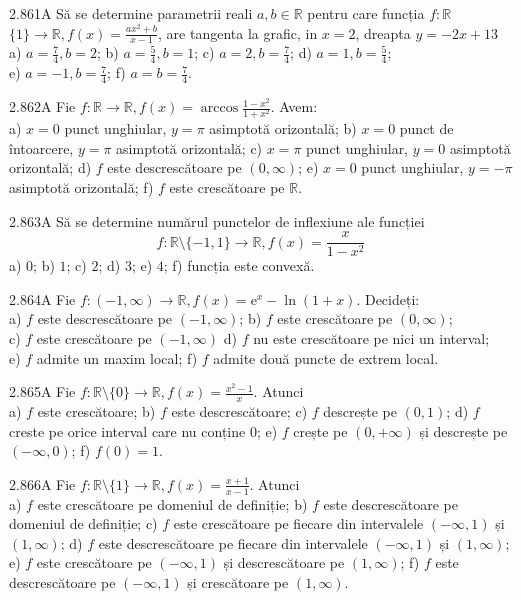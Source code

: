 \documentclass[11pt]{article}
\begin{document}
2.861A Să se determine parametrii reali $a, b \in \mathbb{R}$ pentru care funcția $f: \mathbb{R}$ $\{1\} \rightarrow \mathbb{R}, f(x)=\frac{a x^{2}+b}{x-1}$, are tangenta la grafic, in $x=2$, dreapta $y=-2 x+13$\\ a) $a=\frac{7}{4}, b=2$; b) $a=\frac{5}{4}, b=1$; c) $a=2, b=\frac{7}{4}$; d) $a=1, b=\frac{5}{4}$;\\ e) $a=-1, b=\frac{7}{4}$; f) $a=b=\frac{7}{4}$.

2.862A Fie $f: \mathbb{R} \rightarrow \mathbb{R}, f(x)=\arccos \frac{1-x^{2}}{1+x^{2}}$. Avem:\\ a) $x=0$ punct unghiular, $y=\pi$ asimptotă orizontală; b) $x=0$ punct de întoarcere, $y=\pi$ asimptotă orizontală; c) $x=\pi$ punct unghiular, $y=0$ asimptotă orizontală; d) $f$ este descrescătoare pe $(0, \infty)$; e) $x=0$ punct unghiular, $y=-\pi$ asimptotă orizontală; f) $f$ este crescătoare pe $\mathbb{R}$.

2.863A Să se determine numărul punctelor de inflexiune ale funcției $$f: \mathbb{R} \setminus\{-1,1\} \rightarrow \mathbb{R}, f(x)=\frac{x}{1-x^{2}}$$ a) $0$; b) $1$; c) $2$; d) $3$; e) $4$; f) funcția este convexă.

2.864A Fie $f:(-1, \infty) \rightarrow \mathbb{R}, f(x)=\mathrm{e}^{x}-\ln (1+x)$. Decideți:\\ a) $f$ este descrescătoare pe $(-1, \infty)$; b) $f$ este crescătoare pe $(0, \infty)$;\\ c) $f$ este crescătoare pe $(-1, \infty)$ d) $f$ nu este crescătoare pe nici un interval;\\ e) $f$ admite un maxim local; f) $f$ admite două puncte de extrem local.

2.865A Fie $f: \mathbb{R} \setminus\{0\} \rightarrow \mathbb{R}, f(x)=\frac{x^{2}-1}{x}$. Atunci\\ a) $f$ este crescătoare; b) $f$ este descrescătoare; c) $f$ descrește pe $(0,1)$; d) $f$ creste pe orice interval care nu conține $0$; e) $f$ crește pe $(0,+\infty)$ și descrește pe $(-\infty, 0)$; f) $f(0)=1$.

2.866A Fie $f: \mathbb{R} \setminus\{1\} \rightarrow \mathbb{R}, f(x)=\frac{x+1}{x-1}$. Atunci\\ a) $f$ este crescătoare pe domeniul de definiție; b) $f$ este descrescătoare pe domeniul de definiție; c) $f$ este crescătoare pe fiecare din intervalele $(-\infty, 1)$ și $(1, \infty)$; d) $f$ este descrescătoare pe fiecare din intervalele $(-\infty, 1)$ și $(1, \infty)$; e) $f$ este crescătoare pe $(-\infty, 1)$ și descrescătoare pe $(1, \infty)$; f) $f$ este descrescătoare pe $(-\infty, 1)$ și crescătoare pe $(1, \infty)$.
\end{document}
